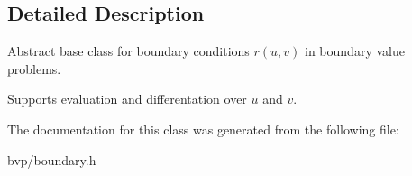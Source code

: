 \subsection{Detailed Description}
Abstract base class for boundary conditions $r(u,v)$ in boundary value problems. 

Supports evaluation and differentation over $u$ and $v$. 

The documentation for this class was generated from the following file\+:\begin{DoxyCompactItemize}
\item 
bvp/boundary.\+h\end{DoxyCompactItemize}

